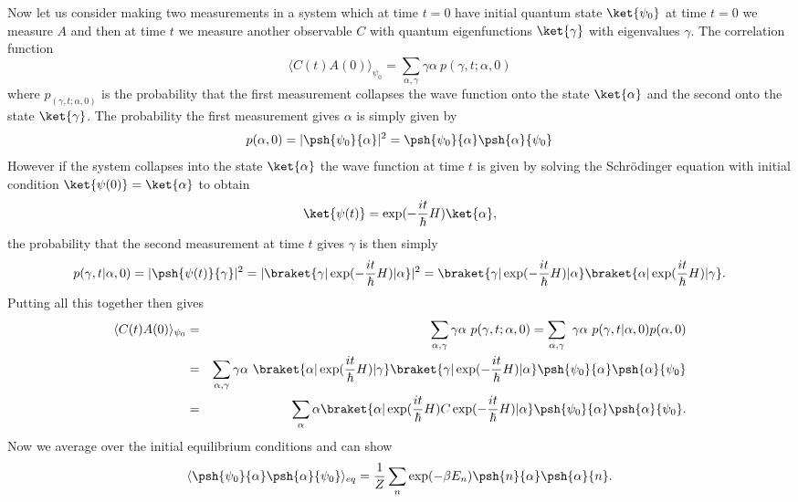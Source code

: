 Now let us consider making two measurements in a system which at time $t=0$ have initial quantum state $\ket{\psi_0}$ at time $t=0$ we measure $A$ and then at time $t$ we measure
another observable $C$ with quantum eigenfunctions $\ket{\gamma}$ with eigenvalues $\gamma$. The correlation function
\begin{equation}
\langle C(t) A(0)\rangle_{\psi_0} = \sum_{\alpha,\gamma} \gamma \alpha \ p(\gamma,t;\alpha,0)
\end{equation}
where $p_(\gamma,t;\alpha,0)$ is the probability that the first measurement collapses the wave function onto the state $\ket{\alpha}$ and the second onto the state $\ket{\gamma}$.
The probability the first measurement gives $\alpha$ is simply given by
\begin{equation}
p(\alpha,0) = |\psh{\psi_0}{\alpha}|^2 = \psh{\psi_0}{\alpha}\psh{\alpha}{\psi_0}
\end{equation}
However if the system collapses into the state $\ket{\alpha}$ the wave function at time $t$ 
is given by solving the Schr\"odinger equation with initial condition $\ket{\psi(0)} = \ket{\alpha}$ to obtain
\begin{equation}
\ket{\psi(t)} = \exp(-\frac{it}{\hbar}H)\ket{\alpha},
\end{equation}
the probability that the second measurement at time $t$ gives $\gamma$ is then simply
\begin{equation}
p(\gamma,t|\alpha,0) = |\psh{\psi(t)}{\gamma}|^2 = |\braket{\gamma |\exp(-\frac{it}{\hbar}H)|\alpha}|^2 = \braket{\gamma |\exp(-\frac{it}{\hbar}H)|\alpha}\braket{\alpha |\exp(\frac{it}{\hbar}H)|\gamma}.
\end{equation}
Putting all this together then gives
\begin{eqnarray}
\langle C(t) A(0)\rangle_{\psi_0} &=& \sum_{\alpha,\gamma} \gamma \alpha \ p(\gamma,t;\alpha,0)= \sum_{\alpha,\gamma} \ \gamma \alpha \ p(\gamma,t|\alpha,0)p(\alpha,0)\nonumber
\\
&=& \sum_{\alpha,\gamma} \gamma \alpha \ \braket{\alpha |\exp(\frac{it}{\hbar}H)|\gamma} \braket{\gamma |\exp(-\frac{it}{\hbar}H)|\alpha}\psh{\psi_0}{\alpha}\psh{\alpha}{\psi_0}\nonumber \\
&=& \sum_{\alpha}  \alpha  \braket{\alpha |\exp(\frac{it}{\hbar}H) C \exp(-\frac{it}{\hbar}H)|\alpha}\psh{\psi_0}{\alpha}\psh{\alpha}{\psi_0}.
\end{eqnarray}
Now we average over the initial equilibrium conditions and can show 
\begin{eqnarray}
\langle \psh{\psi_0}{\alpha}\psh{\alpha}{\psi_0}\rangle_{eq} =\frac{1}{Z} \sum_n \exp(-\beta E_n)\psh{n}{\alpha}\psh{\alpha}{n}.
\end{eqnarray}
